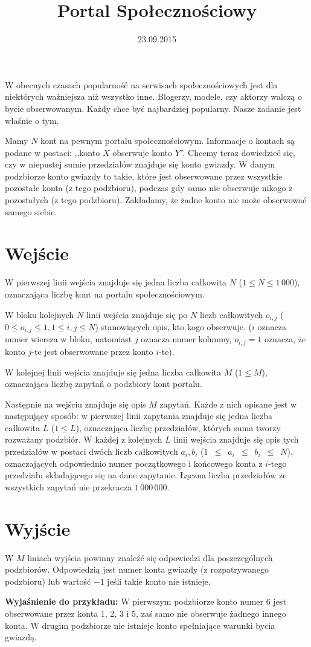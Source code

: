 \documentclass[zad,zawodnik,utf8]{sinol}
\title{Portal Społecznościowy}
\author{}
\date{23.09.2015}
\begin{document}
  \begin{tasktext}%
W obecnych czasach popularność na serwisach społecznościowych jest dla niektórych ważniejsza niż wszystko inne. Blogerzy, modele, czy aktorzy walczą o bycie obserwowanym. Każdy chce być najbardziej popularny. Nasze zadanie jest właśnie o tym.

Mamy $N$ kont na pewnym portalu społecznościowym. Informacje o kontach są podane w postaci: ,,konto $X$ obserwuje konto $Y$''. Chcemy teraz dowiedzieć się, czy w niepustej sumie przedziałów znajduje się konto gwiazdy. W danym podzbiorze konto gwiazdy to takie, które jest obserwowane przez wszystkie pozostałe konta (z tego podzbioru), podczas gdy samo nie obserwuje nikogo z pozostałych (z tego podzbioru). Zakładamy, że żadne konto nie może obserwować samego siebie.

  \section{Wejście}
W pierwszej linii wejścia znajduje się jedna liczba całkowita $N$ ($1 \leq N \leq 1\,000$), oznaczająca liczbę kont na portalu społecznościowym.

W bloku kolejnych $N$ linii wejścia znajduje się po $N$ liczb całkowitych $o_{i,j}$ ($0 \leq o_{i,j} \leq 1, 1 \leq i, j \leq N$) stanowiących opis, kto kogo obserwuje. ($i$ oznacza numer wiersza w bloku, natomiast $j$ oznacza numer kolumny, $o_{i,j} = 1$ oznacza, że konto $j$-te jest obserwowane przez konto $i$-te).

W kolejnej linii wejścia znajduje się jedna liczba całkowita $M$ ($1 \leq M$), oznaczająca liczbę zapytań o podzbiory kont portalu.

Następnie na wejściu znajduje się opis $M$ zapytań. Każde z nich opisane jest w następujący sposób: w pierwszej linii zapytania znajduje się jedna liczba całkowita $L$ ($1 \leq L$), oznaczająca liczbę przedziałów, których suma tworzy rozważany podzbiór. W każdej z kolejnych $L$ linii wejścia znajduje się opis tych przedziałów w postaci dwóch liczb całkowitych $a_i, b_i$ ($1$~$\leq$~$a_i$~$\leq$~$b_i$~$\leq$~$N$), oznaczających odpowiednio numer początkowego i końcowego konta z $i$-tego przedziału składającego się na dane zapytanie. Łączna liczba przedziałów ze wszystkich zapytań nie przekracza $1\,000\,000$.

  \section{Wyjście}
W $M$ liniach wyjścia powinny znaleźć się odpowiedzi dla poszczególnych podzbiorów. Odpowiedzią jest numer konta gwiazdy (z rozpatrywanego podzbioru) lub wartość $-1$ jeśli takie konto nie istnieje.

     \makecompactexample

\medskip
  \noindent
  \textbf{Wyjaśnienie do przykładu:} W pierwszym podzbiorze konto numer 6 jest obserwowane przez konta 1, 2, 3 i 5, zaś samo nie obserwuje żadnego innego konta. W drugim podzbiorze nie istnieje konto spełniające warunki bycia gwiazdą.

  \end{tasktext}
\end{document}
